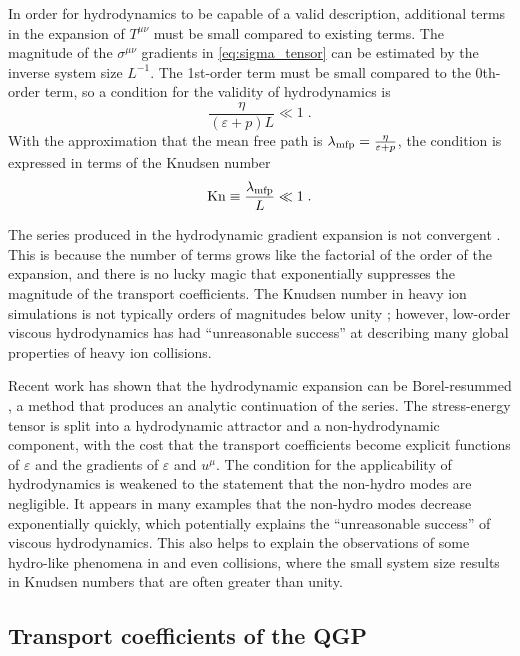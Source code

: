 In order for hydrodynamics to be capable of a valid description, additional terms in the expansion of $T^{\mu\nu}$ must be small compared to existing terms.
The magnitude of the $\sigma^{\mu\nu}$ gradients in \cref{eq:sigma_tensor} can be estimated by the inverse system size $L^{-1}$.
The 1st-order term must be small compared to the 0th-order term, so a condition for the validity of hydrodynamics is %
\begin{equation}
  \frac{\eta}{(\varepsilon + p)L} \ll 1 \;.
\end{equation}
With the approximation that the mean free path is \(\lambda_\textrm{mfp} = \frac{\eta}{\varepsilon + p} \), the condition is expressed in terms of the Knudsen number
\begin{equation}
  \mathrm{Kn} \equiv \frac{\lambda_\textrm{mfp}}{L} \ll 1 \;.
\end{equation}

The series produced in the hydrodynamic gradient expansion is not convergent \cite{Denicol:2016bjh}.
This is because the number of terms grows like the factorial of the order of the expansion, and there is no lucky magic that exponentially suppresses the magnitude of the transport coefficients.
The Knudsen number in heavy ion simulations is not typically orders of magnitudes below unity \cite{Niemi:2014wta}; however, low-order viscous hydrodynamics has had ``unreasonable success'' at describing many global properties of heavy ion collisions.

Recent work has shown that the hydrodynamic expansion can be Borel-resummed \cite{Romatschke:2016hle,Romatschke:2017vte}, a method that produces an analytic continuation of the series.
The stress-energy tensor is split into a hydrodynamic attractor and a non-hydrodynamic component, with the cost that the transport coefficients become explicit functions of $\varepsilon$ and the gradients of $\varepsilon$ and $u^\mu$.
The condition for the applicability of hydrodynamics is weakened to the statement that the non-hydro modes are negligible.
It appears in many examples that the non-hydro modes decrease exponentially quickly, which potentially explains the ``unreasonable success'' of viscous hydrodynamics.
This also helps to explain the observations of some hydro-like phenomena in \pPb and even \pp collisions, where the small system size results in Knudsen numbers that are often greater than unity.


\subsection{Transport coefficients of the QGP} %

